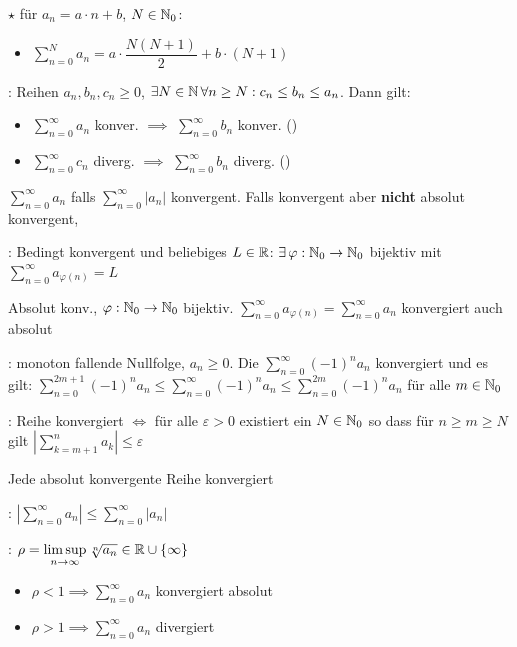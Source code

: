 \Satz $\star$  für $a_n = a \cdot n + b$, $N \in \mathbb{N}_0$:
\vspace{-0.6em}
\begin{itemize}
    \item $\sum_{n=0}^{N} a_n = a \cdot \dfrac{N(N+1)}{2} + b \cdot (N+1)$
\end{itemize}

\Satz {}: Reihen $a_n, b_n, c_n\ge 0$,
$\exists N \in \mathbb{N} \, \forall n\ge N : c_n\le b_n\le a_n$. Dann gilt:
\vspace{-0.6em}
\begin{itemize}
    \item $\sum_{n=0}^{\infty} a_n$ konver. $\implies$ $\sum_{n=0}^{\infty} b_n$ konver. ()
    \item $\sum_{n=0}^{\infty} c_n$ diverg. $\implies$ $\sum_{n=0}^{\infty} b_n$ diverg. ()
\end{itemize}

\Def $\sum_{n=0}^{\infty} a_n$  falls $\sum_{n=0}^{\infty} |a_n|$ konvergent.
Falls konvergent aber \textbf{nicht} absolut konvergent, 

\Satz {}: Bedingt konvergent und beliebiges $L \in \mathbb{R}$:
$\exists \, \varphi: \mathbb{N}_0 \to \mathbb{N}_0$ bijektiv mit $\sum_{n=0}^{\infty} a_{\varphi(n)} = L$

\Satz {} Absolut konv., $\varphi: \mathbb{N}_0 \to \mathbb{N}_0$ bijektiv.
$\sum_{n=0}^{\infty} a_{\varphi(n)} = \sum_{n=0}^{\infty} a_n$ konvergiert auch absolut

\Satz {}: monoton fallende Nullfolge, $a_n \ge 0$.
Die  $\sum_{n=0}^{\infty} (-1)^n a_n$ konvergiert und es gilt:
$\sum_{n=0}^{2m+1} (-1)^n a_n\le \sum_{n=0}^{\infty} (-1)^n a_n\le \sum_{n=0}^{2m} (-1)^n a_n$ für alle $m \in \mathbb{N}_0$

\Satz {}: Reihe konvergiert $\iff$ für alle $\varepsilon > 0$ existiert ein $N \in \mathbb{N}_0$ so dass für $n\ge m\ge N$ gilt $|\sum_{k = m+1}^{n} a_k|\le \varepsilon$

\Satz Jede absolut konvergente Reihe konvergiert

\Satz {}: $\left|\sum\limits_{n=0}^{\infty} a_n \right|\le \sum\limits_{n=0}^{\infty}|a_n|$

\Satz {}: $\rho = \limsup\limits_{n\to\infty} \sqrt[n]{a_n} \in \mathbb{R} \cup \{\infty\}$
\vspace{-0.6em}
\begin{itemize}
    \item $\rho < 1 \implies \sum_{n=0}^{\infty} a_n$ konvergiert absolut
    \item $\rho > 1 \implies \sum_{n=0}^{\infty} a_n$ divergiert
\end{itemize}

